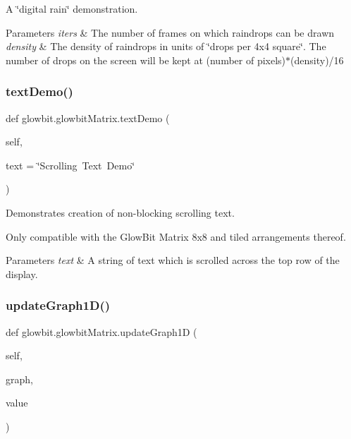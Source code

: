 A \char`\"{}digital rain\char`\"{} demonstration. 


\begin{DoxyParams}{Parameters}
{\em iters} & The number of frames on which raindrops can be drawn \\
\hline
{\em density} & The density of raindrops in units of \char`\"{}drops per 4x4 square\char`\"{}. The number of drops on the screen will be kept at (number of pixels)$\ast$(density)/16 \\
\hline
\end{DoxyParams}
\mbox{\label{classglowbit_1_1glowbitMatrix_a6232220b12c86c7ec361cde374419ac4}} 
\subsubsection{\texorpdfstring{text\+Demo()}{textDemo()}}
{\footnotesize\ttfamily def glowbit.\+glowbit\+Matrix.\+text\+Demo (\begin{DoxyParamCaption}\item[{}]{self,  }\item[{}]{text = {\ttfamily \char`\"{}Scrolling~Text~Demo\char`\"{}} }\end{DoxyParamCaption})}



Demonstrates creation of non-\/blocking scrolling text. 

Only compatible with the Glow\+Bit Matrix 8x8 and tiled arrangements thereof.


\begin{DoxyParams}{Parameters}
{\em text} & A string of text which is scrolled across the top row of the display. \\
\hline
\end{DoxyParams}
\mbox{\label{classglowbit_1_1glowbitMatrix_a0d44976cdc12728d9ae80c2d901029c0}} 
\subsubsection{\texorpdfstring{update\+Graph1\+D()}{updateGraph1D()}}
{\footnotesize\ttfamily def glowbit.\+glowbit\+Matrix.\+update\+Graph1D (\begin{DoxyParamCaption}\item[{}]{self,  }\item[{}]{graph,  }\item[{}]{value }\end{DoxyParamCaption})}



